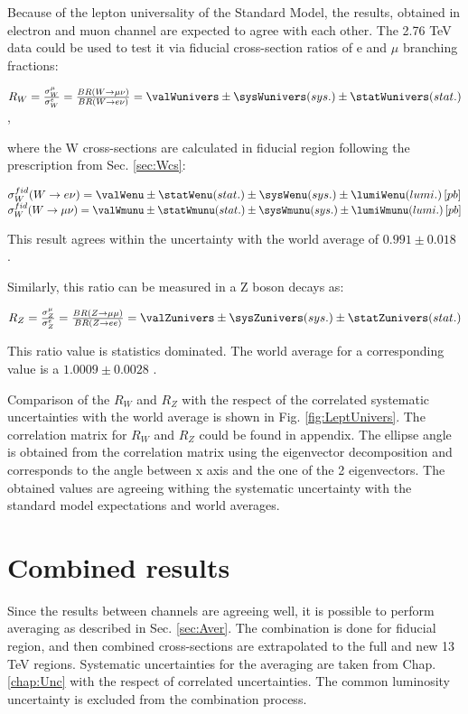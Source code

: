 Because of the lepton universality of the Standard Model, the results, obtained in electron and muon channel are expected to agree with each other. The 2.76 TeV data could be used to test it via fiducial cross-section ratios of e and $\mu$ branching fractions:
\begin{center}
$R_{W}=\frac{\sigma^{\mu}_W}{\sigma^{e}_W} = \frac{BR(\wmunu)}{BR(\wenu)}= \valWunivers \pm \sysWunivers (sys.) \pm \statWunivers (stat.)$,
\end{center}
where the W cross-sections are calculated in fiducial region following the prescription from Sec. \ref{sec:Wcs}:
\begin{center}
$\sigma^{fid}_{W}(\wenu) = \valWenu  \pm \statWenu (stat.) \pm \sysWenu (sys.) \pm \lumiWenu (lumi.) \, [pb]$\\
$\sigma^{fid}_{W}(\wmunu) = \valWmunu  \pm \statWmunu (stat.) \pm \sysWmunu (sys.) \pm \lumiWmunu (lumi.) \, [pb]$
\end{center}
This result agrees within the uncertainty with the world average of $0.991\pm0.018$ \cite{Agashe:2014kda}. 

Similarly, this ratio can be measured in a Z boson decays as:
\begin{center}
$R_{Z}=\frac{\sigma^{\mu}_Z}{\sigma^{e}_Z} = \frac{BR(Z\to \mu\mu)}{BR(Z \to ee)}= \valZunivers \pm \sysZunivers(sys.) \pm \statZunivers (stat.)$
\end{center}
This ratio value is statistics dominated. The world average for a corresponding value is a $1.0009 \pm 0.0028$ \cite{Agashe:2014kda}. 

Comparison of the $R_W$ and $R_Z$ with the respect of the correlated systematic uncertainties with the world average is shown in Fig. \ref{fig:LeptUnivers}. The correlation matrix for $R_W$ and $R_Z$ could be found in appendix. The ellipse angle is obtained from the correlation matrix using the eigenvector decomposition and corresponds to the angle between x axis and the one of the 2 eigenvectors. The obtained values are agreeing withing the systematic uncertainty with the standard model expectations and world averages.




\section{Combined results}\label{sec:CombCs}

Since the results between channels are agreeing well, it is possible to perform averaging as described in Sec. \ref{sec:Aver}. The combination is done for fiducial region, and then combined cross-sections are extrapolated to the full and new 13 TeV regions. Systematic uncertainties for the averaging are taken from Chap. \ref{chap:Unc} with the respect of correlated uncertainties. The common luminosity uncertainty is excluded from the combination process.

